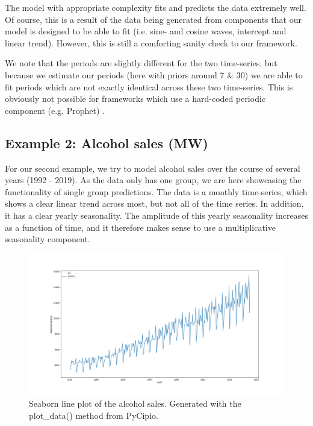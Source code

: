 \documentclass{article}
\begin{document}
\noindent The model with appropriate complexity fits and predicts the data extremely well. Of course, this is a result of the data being generated from components that our model is designed to be able to fit (i.e. sine- and cosine waves, intercept and linear trend). However, this is still a comforting sanity check to our framework.

\noindent We note that the periods are slightly different for the two time-series, but because we estimate our periods (here with priors around 7 \& 30) we are able to fit periods which are not exactly identical across these two time-series. This is obviously not possible for frameworks which use a hard-coded periodic component (e.g. Prophet) \cite{taylor2018forecasting}. 

\subsection{Example 2: Alcohol sales (MW)}

\noindent For our second example, we try to model alcohol sales over the course of several years (1992 - 2019). As the data only has one group, we are here showcasing the functionality of single group predictions. The data is a monthly time-series, which shows a clear linear trend across most, but not all of the time series. In addition, it has a clear yearly seasonality. The amplitude of this yearly seasonality increases as a function of time, and it therefore makes sense to use a multiplicative seasonality component.

\begin{figure}[H]
    \centerline{\includegraphics[scale = 0.45]{../plots/ex2_plot_data.png}}
    \caption{Seaborn line plot of the alcohol sales. Generated with the plot\_data() method from PyCipio. }
\end{figure}
\end{document}
